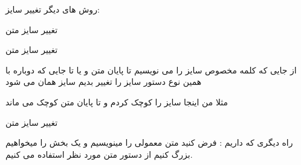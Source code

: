 \documentclass{article}
\begin{document}
روش های دیگر تغییر سایز:



تغییر سایز متن

تغییر سایز متن

\huge
از جایی که کلمه مخصوص سایز را می نویسیم تا پایان متن و یا تا جایی که دوباره با همین نوع دستور سایز را تغییر بدیم سایز همان می شود
\small

مثلا من اینجا سایز را کوچک کردم و تا پایان متن کوچک می ماند

تغییر سایز متن

راه دیگری که داریم : فرض کنید متن معمولی را مینویسیم و یک بخش  را میخواهیم بزرگ کنیم از دستور
{\Large  متن مورد نظر} 
 استفاده می کنیم.
 
 
\end{document}
